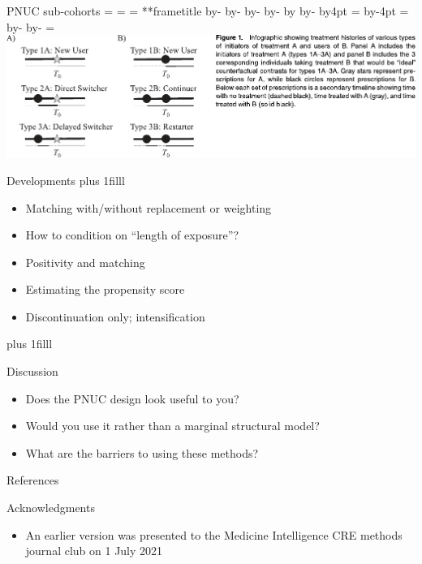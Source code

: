 \documentclass[aspectratio=169,12pt]{beamer} %
\makeatletter
\newif\ifsidebartheme
\newcommand*{\calculatespace}{%
    \contentheight=\paperheight%
    \ifx\beamer@frametitle\@empty%
        \setbox\@tempboxa=\box\voidb@x%
      \else%
        \setbox\@tempboxa=\vbox{%
          \vbox{}%
          {\parskip0pt\usebeamertemplate***{frametitle}}%
        }%
        \ifsidebartheme%
          \advance\contentheight by-1em%
        \fi%
      \fi%
    \advance\contentheight by-\ht\@tempboxa%
    \advance\contentheight by-\dp\@tempboxa%
    \advance\contentheight by-\beamer@frametopskip%
    \ifbeamer@plainframe%
    \contentbottom=0pt%
    \else%
    \advance\contentheight by-\headheight%
    \advance\contentheight by\headdp%
    \advance\contentheight by-\footheight%
    \advance\contentheight by4pt%
    \contentbottom=\footheight%
    \advance\contentbottom by-4pt%
    \fi%
    \contentwidth=\paperwidth%
    \ifbeamer@plainframe%
    \contentleft=0pt%
    \else%
    \advance\contentwidth by-\beamer@rightsidebar%
    \advance\contentwidth by-\beamer@leftsidebar\relax%
    \contentleft=\beamer@leftsidebar%
    \fi%
}
\makeatother
\begin{document}
\begin{frame}{PNUC sub-cohorts}
    \calculatespace%
	\includegraphics[width=0.85\contentwidth]{ref/webster-fig1.pdf}
\end{frame}

\begin{frame}{Developments}
\vskip0pt plus 1filll
    \begin{itemize}
	\item Matching with/without replacement or weighting
	\item How to condition on ``length of exposure''?
	\item Positivity and matching
	\item Estimating the propensity score
	\item Discontinuation only; intensification
    \end{itemize}
\vskip0pt plus 1filll
\end{frame}

\begin{frame}{Discussion}
    \begin{itemize}
	\item Does the PNUC design look useful to you?
	\item Would you use it rather than a marginal structural model?
    	\item What are the barriers to using these methods?
    \end{itemize}
\end{frame}

\begin{frame}{References}
        \tiny
        
\end{frame}

\begin{frame}{Acknowledgments}
    \begin{itemize}
	\item An earlier version was presented to the Medicine
	Intelligence CRE methods journal club on 1 July 2021
    \end{itemize}
\end{frame}
\end{document}
